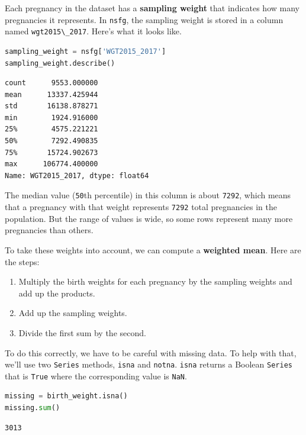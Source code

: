 \documentclass[
]{book}
\newcommand{\passthrough}[1]{#1}
\begin{document}
Each pregnancy in the dataset has a \textbf{sampling weight} that
indicates how many pregnancies it represents. In
\passthrough{\lstinline!nsfg!}, the sampling weight is stored in a
column named \passthrough{\lstinline!wgt2015\_2017!}. Here's what it
looks like.

\begin{lstlisting}[language=Python]
sampling_weight = nsfg['WGT2015_2017']
sampling_weight.describe()
\end{lstlisting}

\begin{lstlisting}
count      9553.000000
mean      13337.425944
std       16138.878271
min        1924.916000
25%        4575.221221
50%        7292.490835
75%       15724.902673
max      106774.400000
Name: WGT2015_2017, dtype: float64
\end{lstlisting}

The median value (\passthrough{\lstinline!50!}th percentile) in this
column is about \passthrough{\lstinline!7292!}, which means that a
pregnancy with that weight represents \passthrough{\lstinline!7292!}
total pregnancies in the population. But the range of values is wide, so
some rows represent many more pregnancies than others.

To take these weights into account, we can compute a \textbf{weighted
mean}. Here are the steps:

\begin{enumerate}
\def\labelenumi{\arabic{enumi}.}
\item
  Multiply the birth weights for each pregnancy by the sampling weights
  and add up the products.
\item
  Add up the sampling weights.
\item
  Divide the first sum by the second.
\end{enumerate}

To do this correctly, we have to be careful with missing data. To help
with that, we'll use two \passthrough{\lstinline!Series!} methods,
\passthrough{\lstinline!isna!} and \passthrough{\lstinline!notna!}.
\passthrough{\lstinline!isna!} returns a Boolean
\passthrough{\lstinline!Series!} that is \passthrough{\lstinline!True!}
where the corresponding value is \passthrough{\lstinline!NaN!}.

\begin{lstlisting}[language=Python]
missing = birth_weight.isna()
missing.sum()
\end{lstlisting}

\begin{lstlisting}
3013
\end{lstlisting}
\end{document}
